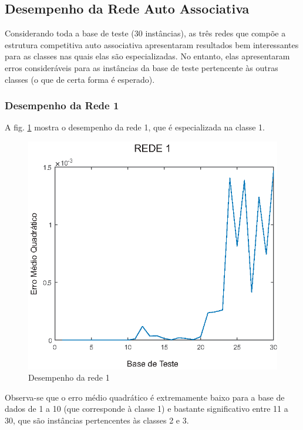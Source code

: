 \subsection{Desempenho da Rede Auto Associativa}

Considerando toda a base de teste (30 instâncias), as três redes que compõe a estrutura competitiva auto associativa apresentaram resultados bem interessantes para as classes nas quais elas são especializadas. No entanto, elas apresentaram erros consideráveis para as instâncias da base de teste pertencente às outras classes (o que de certa forma é esperado).


\subsubsection{Desempenho da Rede 1}

A fig. \ref{figura:rede1} mostra o desempenho da rede 1, que é especializada na classe 1.

\begin{figure}[H]

\centering %
\includegraphics{04-Figuras/MSE_DesempenhoNet1}

\caption{Desempenho da rede 1}

\label{figura:rede1}

\end{figure}

Observa-se que o erro médio quadrático é extremamente baixo para a base de dados de 1 a 10 (que corresponde à classe 1) e bastante significativo entre 11 a 30, que são instâncias pertencentes às classes 2 e 3.

